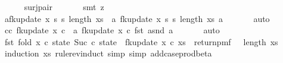 \begin{isabellebody}
\ \ \ \ \isamarkupfalse%
\ surj{\isacharunderscore}{\kern0pt}pair\ \isanewline
\ \ \ \ \isamarkupfalse%
\ {\isacharparenleft}{\kern0pt}smt\ {\isacharparenleft}{\kern0pt}z{}{\isacharparenright}{\kern0pt}{\isacharparenright}{\kern0pt}\isanewline
\ \ \isamarkupfalse%
\ a{\isacharcolon}{\kern0pt}{\isachardoublequoteopen}fk{\isacharunderscore}{\kern0pt}update{\isacharprime}{\kern0pt}\ x\ s\ s\ {\isacharparenleft}{\kern0pt}length\ xs{\isacharparenright}{\kern0pt}\ {\isacharequal}{\kern0pt}\ {\isacharparenleft}{\kern0pt}{\isasymlambda}a{\isachardot}{\kern0pt}\ fk{\isacharunderscore}{\kern0pt}update{\isacharprime}{\kern0pt}\ x\ s\ s\ {\isacharparenleft}{\kern0pt}length\ xs{\isacharparenright}{\kern0pt}\ a{\isacharparenright}{\kern0pt}{\isachardoublequoteclose}\ \isanewline
\ \ \ \ \isamarkupfalse%
\ auto\isanewline
\ \ \isamarkupfalse%
\ c{\isacharcolon}{\kern0pt}{\isachardoublequoteopen}{\isasymAnd}c{\isachardot}{\kern0pt}\ fk{\isacharunderscore}{\kern0pt}update{\isacharprime}{\kern0pt}{\isacharprime}{\kern0pt}\ x\ c\ {\isacharequal}{\kern0pt}\ {\isacharparenleft}{\kern0pt}{\isasymlambda}a{\isachardot}{\kern0pt}\ fk{\isacharunderscore}{\kern0pt}update{\isacharprime}{\kern0pt}{\isacharprime}{\kern0pt}\ x\ c\ {\isacharparenleft}{\kern0pt}fst\ a{\isacharcomma}{\kern0pt}snd\ a{\isacharparenright}{\kern0pt}{\isacharparenright}{\kern0pt}{\isachardoublequoteclose}\ \isanewline
\ \ \ \ \isamarkupfalse%
\ auto\isanewline
\ \ \isamarkupfalse%
\ {\isachardoublequoteopen}fst\ {\isacharparenleft}{\kern0pt}fold\ {\isacharparenleft}{\kern0pt}{\isasymlambda}x\ {\isacharparenleft}{\kern0pt}c{\isacharcomma}{\kern0pt}\ state{\isacharparenright}{\kern0pt}{\isachardot}{\kern0pt}\ {\isacharparenleft}{\kern0pt}Suc\ c{\isacharcomma}{\kern0pt}\ state\ {\isasymbind}\ fk{\isacharunderscore}{\kern0pt}update{\isacharprime}{\kern0pt}{\isacharprime}{\kern0pt}\ x\ c{\isacharparenright}{\kern0pt}{\isacharparenright}{\kern0pt}\ xs\ {\isacharparenleft}{\kern0pt}{}{\isacharcomma}{\kern0pt}\ return{\isacharunderscore}{\kern0pt}pmf\ {\isacharparenleft}{\kern0pt}{}{\isacharcomma}{\kern0pt}{}{\isacharparenright}{\kern0pt}{\isacharparenright}{\kern0pt}{\isacharparenright}{\kern0pt}\ {\isacharequal}{\kern0pt}\ length\ xs{\isachardoublequoteclose}\isanewline
\ \ \ \ \isamarkupfalse%
\ {\isacharparenleft}{\kern0pt}induction\ xs\ rule{\isacharcolon}{\kern0pt}rev{\isacharunderscore}{\kern0pt}induct{\isacharcomma}{\kern0pt}\ simp{\isacharcomma}{\kern0pt}\ simp\ add{\isacharcolon}{\kern0pt}case{\isacharunderscore}{\kern0pt}prod{\isacharunderscore}{\kern0pt}beta{\isacharparenright}{\kern0pt}\isanewline

\end{isabellebody}
